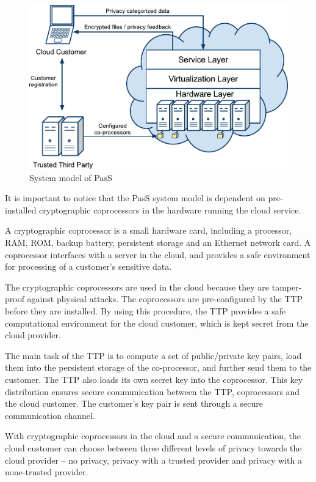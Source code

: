 \documentclass[pdftex,english,10pt,b5paper,twoside]{book}
\begin{document}
\begin{figure}[h!]
    \centering
    \includegraphics[scale=0.6]{ArchitecturePasS.pdf}
    \caption{System model of PasS}
    \label{fig:RW:PasS}
\end{figure}

It is important to notice that the \ac{PasS} system model is dependent on
pre-installed cryptographic coprocessors in the hardware running the cloud
service.

A cryptographic coprocessor is a small hardware card, including a processor,
\ac{RAM}, \ac{ROM}, backup battery, persistent storage and an Ethernet network
card. A coprocessor interfaces with a server in the cloud, and provides a safe
environment for processing of a customer's sensitive data.

The cryptographic coprocessors are used in the cloud because they are
tamper-proof against physical attacks. The coprocessors are pre-configured by
the \ac{TTP} before they are installed. By using this procedure, the \ac{TTP}
provides a safe computational environment for the cloud customer, which is kept
secret from the cloud provider.

The main task of the \ac{TTP} is to compute a set of public/private key pairs,
load them into the persistent storage of the co-processor, and further send
them to the customer. The \ac{TTP} also loads its own secret key into the
coprocessor. This key distribution ensures secure communication between the
\ac{TTP}, coprocessors and the cloud customer. The customer's key pair is sent
through a secure communication channel.

With cryptographic coprocessors in the cloud and a secure communication, the
cloud customer can choose between three different levels of privacy towards the
cloud provider -- no privacy, privacy with a trusted provider and privacy with
a none-trusted provider.
\end{document}
